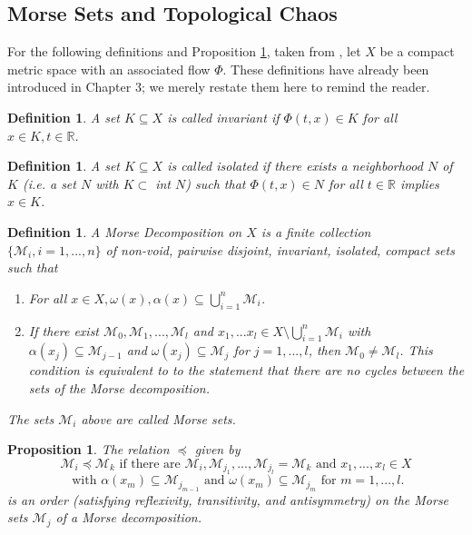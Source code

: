 \documentclass[11pt]{article}
\newtheorem{defn}[thm]{Definition}
\newtheorem{prop}[thm]{Proposition}
\begin{document}
\subsection{Morse Sets and Topological Chaos}

For the following definitions and Proposition \ref{order}, taken from \cite{Kliemann}, let $X$ be a compact metric space with an associated flow $\Phi$.  These definitions have already been introduced in Chapter 3; we merely restate them here to remind the reader.

\begin{defn}\label{invariant}
A set $K \subseteq X$ is called invariant if $\Phi(t,x) \in K$ for all $x \in K, t \in \mathbb{R}$.
\end{defn}

\begin{defn}\label{isolated}
A set $K \subseteq X$ is called isolated if there exists a neighborhood $N$ of $K$ (i.e. a set $N$ with $K \subset$ int $N$) such that $\Phi(t,x) \in N$ for all $t \in \mathbb{R}$ implies $x \in K$.
\end{defn}

\begin{defn}\label{morsedecomp}
A Morse Decomposition on $X$ is a finite collection $\{\mathcal{M}_i, i = 1,...,n\}$ of non-void, pairwise disjoint, invariant, isolated, compact sets such that
\begin{enumerate}
\item For all $x \in X, \omega(x), \alpha(x) \subseteq \displaystyle \bigcup_{i=1}^{n}\mathcal{M}_i$.
\item If there exist $\mathcal{M}_0, \mathcal{M}_1, ..., \mathcal{M}_l$ and $x_1,...x_l \in X \setminus \displaystyle \bigcup_{i=1}^{n}\mathcal{M}_i$ with $\alpha(x_j) \subseteq \mathcal{M}_{j-1}$ and $\omega(x_j) \subseteq \mathcal{M}_j$ for $j = 1,...,l$, then $\mathcal{M}_0 \neq \mathcal{M}_l$.  This condition is equivalent to to the statement that there are no cycles between the sets of the Morse decomposition.
\end{enumerate}
The sets $\mathcal{M}_i$ above are called Morse sets.
\end{defn}

\begin{prop}\label{order}
The relation $\preceq$ given by
$$
\mathcal{M}_i \preceq \mathcal{M}_k \mbox{ if there are } \mathcal{M}_i,\mathcal{M}_{j_1},...,\mathcal{M}_{j_l} =
 \mathcal{M}_k \mbox{ and } x_1,...,x_l \in X $$
 $$\mbox{ with } \alpha(x_m) \subseteq \mathcal{M}_{j_{m-1}} \mbox{ and } \omega(x_m) \subseteq \mathcal{M}_{j_m} \mbox{ for } m = 1,...,l.
$$
is an order (satisfying reflexivity, transitivity, and antisymmetry) on the Morse sets $\mathcal{M}_j$ of a Morse decomposition.
\end{prop}
\end{document}
